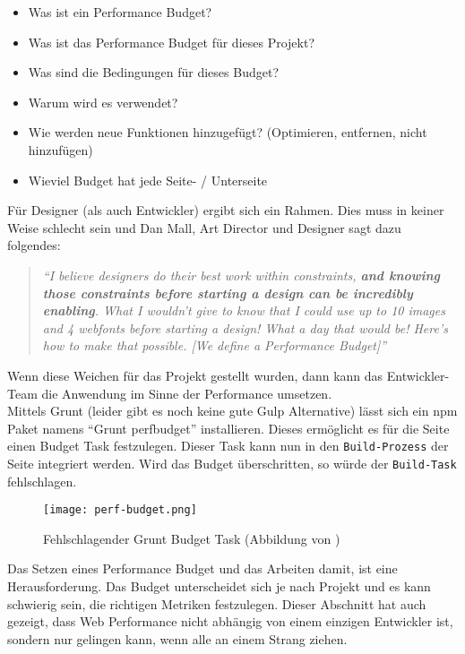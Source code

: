 			\begin{itemize}
				\item Was ist ein Performance Budget?
				\item Was ist das Performance Budget für dieses Projekt?
				\item Was sind die Bedingungen für dieses Budget?
				\item Warum wird es verwendet?
				\item Wie werden neue Funktionen hinzugefügt? (Optimieren, entfernen, nicht hinzufügen)
				\item Wieviel Budget hat jede Seite- / Unterseite
			\end{itemize}

			Für Designer (als auch Entwickler) ergibt sich ein Rahmen. Dies muss in keiner Weise schlecht sein und Dan Mall, Art Director und Designer sagt dazu folgendes:

			\begin{quote}
				\textit{"`I believe designers do their best work within constraints, \textbf{and knowing those constraints before starting a design can be incredibly enabling}. What I wouldn’t give to know that I could use up to 10 images and 4 webfonts before starting a design! What a day that would be! Here’s how to make that possible. [We define a Performance Budget]"'}\autocite{mall14}
			\end{quote}

			Wenn diese Weichen für das Projekt gestellt wurden, dann kann das Entwickler-Team die Anwendung im Sinne der Performance umsetzen.\\
			Mittels Grunt (leider gibt es noch keine gute Gulp Alternative) lässt sich ein npm Paket namens "`Grunt perfbudget"' installieren. Dieses ermöglicht es für die Seite einen Budget Task festzulegen. Dieser Task kann nun in den \texttt{Build-Prozess} der Seite integriert werden. Wird das Budget überschritten, so würde der \texttt{Build-Task} fehlschlagen.

			\begin{figure}[htbp]
				\begin{center}
					\texttt{[image: perf-budget.png]}
					\caption{Fehlschlagender Grunt Budget Task (Abbildung von \autocite{farman14})}
					\label{fig:perf-budget}
				\end{center}
			\end{figure}
		
		Das Setzen eines Performance Budget und das Arbeiten damit, ist eine Herausforderung. Das Budget unterscheidet sich je nach Projekt und es kann schwierig sein, die richtigen Metriken festzulegen. Dieser Abschnitt hat auch gezeigt, dass Web Performance nicht abhängig von einem einzigen Entwickler ist, sondern nur gelingen kann, wenn alle an einem Strang ziehen.	


\pagebreak
%
%
